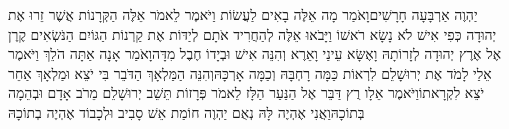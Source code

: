 \documentclass[../main/main.tex]{subfiles}
\begin{document}
\begin{multicols}{\ncols}
יַהְוֶה אַרְבָּעָה חָרָשִׁים\PreVerseSpace{}וָאֹמַר מָה אֵלֶּה בָאִים לַעֲשׂוֹת וַיֹּאמֶר לֵאמֹר אֵלֶּה הַקְּרָנוֹת אֲשֶׁר זֵרוּ אֶת יְהוּדָה כְּפִי אִישׁ לֹא נָשָׂא רֹאשׁוֹ וַיָּבֹאוּ אֵלֶּה לְהַחֲרִיד אֹתָם לְיַדּוֹת אֶת קַרְנוֹת הַגּוֹיִם הַנֹּשְׂאִים קֶרֶן אֶל אֶרֶץ יְהוּדָה לְזָרוֹתָהּ \ClosedSection{}וָאֶשָּׂא עֵינַי וָאֵרֶא וְהִנֵּה אִישׁ וּבְיָדוֹ חֶבֶל מִדָּה\PreVerseSpace{}וָאֹמַר אָנָה אַתָּה הֹלֵךְ וַיֹּאמֶר אֵלַי לָמֹד אֶת יְרוּשָׁלֵם לִרְאוֹת כַּמָּה רָחְבָּהּ וְכַמָּה אָרְכָּהּ\PreVerseSpace{}וְהִנֵּה הַמַּלְאָךְ הַדֹּבֵר בִּי יֹצֵא וּמַלְאָךְ אַחֵר יֹצֵא לִקְרָאתוֹ\PreVerseSpace{}וַיֹּאמֶר אֵלָו רֻץ דַּבֵּר אֶל הַנַּעַר הַלָּז לֵאמֹר פְּרָזוֹת תֵּשֵׁב יְרוּשָׁלֵם מֵרֹב אָדָם וּבְהֵמָה בְּתוֹכָהּ\PreVerseSpace{}וַאֲנִי אֶהְיֶה לָּהּ נְאֻם יַהְוֶה חוֹמַת אֵשׁ סָבִיב וּלְכָבוֹד אֶהְיֶה בְתוֹכָהּ\OpenSection{}\par

\end{multicols}
\end{document}
